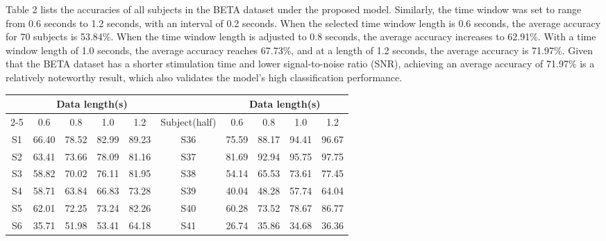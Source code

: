 \documentclass[10pt]{iopart}
\begin{document}
Table 2 lists the accuracies of all subjects in the BETA dataset under the proposed model. Similarly, the time window was set to range from 0.6 seconds to 1.2 seconds, with an interval of 0.2 seconds. When the selected time window length is 0.6 seconds, the average accuracy for 70 subjects is 53.84\%. When the time window length is adjusted to 0.8 seconds, the average accuracy increases to 62.91\%. With a time window length of 1.0 seconds, the average accuracy reaches 67.73\%, and at a length of 1.2 seconds, the average accuracy is 71.97\%. Given that the BETA dataset has a shorter stimulation time and lower signal-to-noise ratio (SNR), achieving an average accuracy of 71.97\% is a relatively noteworthy result, which also validates the model's high classification performance. 
\begin{table*}[htbp]
\begin{center}
\caption{Accuracy of all subjects on Dataset 2 with different data lengths.}
\begin{tabular}{ccccc|ccccc}
\hline
\multicolumn{1}{c|}{}              & \multicolumn{4}{c|}{Data length(s)}                & \multicolumn{1}{c|}{}              & \multicolumn{4}{c}{Data length(s)}     \\ \cline{2-5} \cline{7-10}
\multicolumn{1}{c|}{Subject(half)} & 0.6                  & 0.8     & 1.0     & 1.2     & \multicolumn{1}{c|}{Subject(half)} & 0.6     & 0.8     & 1.0     & 1.2     \\ \hline
S1                                 & 66.40              & 78.52 & 82.99 & 89.23 & S36                                & 75.59 & 88.17 & 94.41 & 96.67 \\
S2                                 & 63.41              & 73.66 & 78.09 & 81.16 & S37                                & 81.69 & 92.94 & 95.75 & 97.75 \\
S3                                 & 58.82              & 70.02 & 76.11 & 81.95 & S38                                & 54.14 & 65.53 & 73.61 & 77.45 \\
S4                                 & 58.71              & 63.84 & 66.83 & 73.28 & S39                                & 40.04 & 48.28 & 57.74 & 64.04 \\
S5                                 & 62.01              & 72.25 & 73.24 & 82.26 & S40                                & 60.28 & 73.52 & 78.67 & 86.77 \\
S6                                 & 35.71              & 51.98 & 53.41 & 64.18 & S41                                & 26.74 & 35.86 & 34.68 & 36.36 \\

\end{tabular}
\end{center}
\end{table*}
\end{document}
